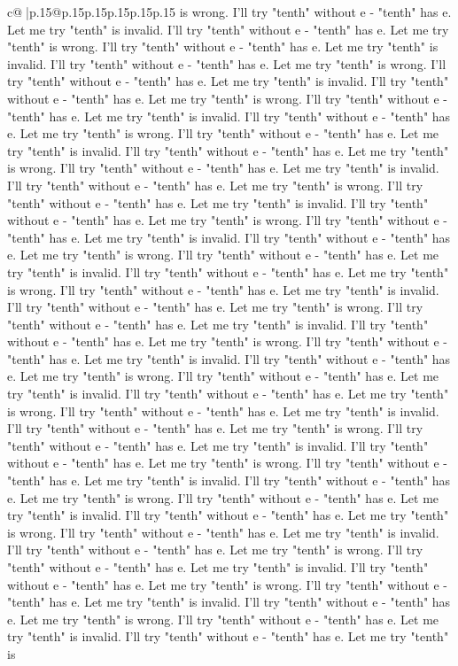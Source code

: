 \documentclass{article}
\begin{document}
{\begin{supertabular}{c@{$\;$}|p{.15\linewidth}@{}p{.15\linewidth}p{.15\linewidth}p{.15\linewidth}p{.15\linewidth}p{.15\linewidth}}
{{{is wrong. I'll try "tenth" without e {-} "tenth" has e. Let me try "tenth" is invalid. I'll try "tenth" without e {-} "tenth" has e. Let me try "tenth" is wrong. I'll try "tenth" without e {-} "tenth" has e. Let me try "tenth" is invalid. I'll try "tenth" without e {-} "tenth" has e. Let me try "tenth" is wrong. I'll try "tenth" without e {-} "tenth" has e. Let me try "tenth" is invalid. I'll try "tenth" without e {-} "tenth" has e. Let me try "tenth" is wrong. I'll try "tenth" without e {-} "tenth" has e. Let me try "tenth" is invalid. I'll try "tenth" without e {-} "tenth" has e. Let me try "tenth" is wrong. I'll try "tenth" without e {-} "tenth" has e. Let me try "tenth" is invalid. I'll try "tenth" without e {-} "tenth" has e. Let me try "tenth" is wrong. I'll try "tenth" without e {-} "tenth" has e. Let me try "tenth" is invalid. I'll try "tenth" without e {-} "tenth" has e. Let me try "tenth" is wrong. I'll try "tenth" without e {-} "tenth" has e. Let me try "tenth" is invalid. I'll try "tenth" without e {-} "tenth" has e. Let me try "tenth" is wrong. I'll try "tenth" without e {-} "tenth" has e. Let me try "tenth" is invalid. I'll try "tenth" without e {-} "tenth" has e. Let me try "tenth" is wrong. I'll try "tenth" without e {-} "tenth" has e. Let me try "tenth" is invalid. I'll try "tenth" without e {-} "tenth" has e. Let me try "tenth" is wrong. I'll try "tenth" without e {-} "tenth" has e. Let me try "tenth" is invalid. I'll try "tenth" without e {-} "tenth" has e. Let me try "tenth" is wrong. I'll try "tenth" without e {-} "tenth" has e. Let me try "tenth" is invalid. I'll try "tenth" without e {-} "tenth" has e. Let me try "tenth" is wrong. I'll try "tenth" without e {-} "tenth" has e. Let me try "tenth" is invalid. I'll try "tenth" without e {-} "tenth" has e. Let me try "tenth" is wrong. I'll try "tenth" without e {-} "tenth" has e. Let me try "tenth" is invalid. I'll try "tenth" without e {-} "tenth" has e. Let me try "tenth" is wrong. I'll try "tenth" without e {-} "tenth" has e. Let me try "tenth" is invalid. I'll try "tenth" without e {-} "tenth" has e. Let me try "tenth" is wrong. I'll try "tenth" without e {-} "tenth" has e. Let me try "tenth" is invalid. I'll try "tenth" without e {-} "tenth" has e. Let me try "tenth" is wrong. I'll try "tenth" without e {-} "tenth" has e. Let me try "tenth" is invalid. I'll try "tenth" without e {-} "tenth" has e. Let me try "tenth" is wrong. I'll try "tenth" without e {-} "tenth" has e. Let me try "tenth" is invalid. I'll try "tenth" without e {-} "tenth" has e. Let me try "tenth" is wrong. I'll try "tenth" without e {-} "tenth" has e. Let me try "tenth" is invalid. I'll try "tenth" without e {-} "tenth" has e. Let me try "tenth" is wrong. I'll try "tenth" without e {-} "tenth" has e. Let me try "tenth" is invalid. I'll try "tenth" without e {-} "tenth" has e. Let me try "tenth" is wrong. I'll try "tenth" without e {-} "tenth" has e. Let me try "tenth" is invalid. I'll try "tenth" without e {-} "tenth" has e. Let me try "tenth" is wrong. I'll try "tenth" without e {-} "tenth" has e. Let me try "tenth" is invalid. I'll try "tenth" without e {-} "tenth" has e. Let me try "tenth" is }}}
\end{supertabular}}
\end{document}
